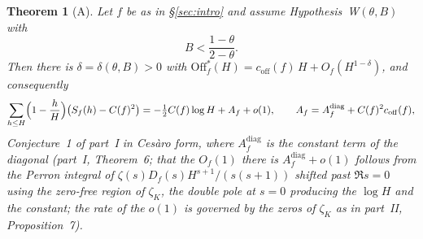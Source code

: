 \documentclass[11pt,a4paper]{article}
\newtheorem{theorem}{Theorem}
\theoremstyle{remark}\newtheorem{remark}[theorem]{Remark}
\newcommand{\Off}{\mathrm{Off}}\newcommand{\e}{\mathrm{e}}
\begin{document}
\begin{theorem}[A]\label{thm:A}
Let $f$ be as in \S\ref{sec:intro} and assume Hypothesis~W$(\theta,B)$ with
\begin{equation}\label{eq:expcond}
B<\frac{1-\theta}{2-\theta} .
\end{equation}
Then there is $\delta=\delta(\theta,B)>0$ with $\Off^\ast_f(H)=c_{\mathrm{off}}(f)\,H+O_f(H^{1-\delta})$, and consequently
\[
\sum_{h\le H}\Bigl(1-\frac hH\Bigr)\bigl(S_f(h)-C(f)^2\bigr)=-\tfrac12C(f)\log H+A_f+o(1),\qquad
A_f=A^{\mathrm{diag}}_f+C(f)^2c_{\mathrm{off}}(f),
\]
Conjecture~1 of part~I in Ces\`aro form, where $A^{\mathrm{diag}}_f$ is the constant term of the diagonal
(part~I, Theorem~6; that the $O_f(1)$ there is $A^{\mathrm{diag}}_f+o(1)$ follows from the Perron integral of
$\zeta(s)D_f(s)H^{s+1}/(s(s+1))$ shifted past $\Re s=0$ using the zero-free region of $\zeta_K$, the double pole at
$s=0$ producing the $\log H$ and the constant; the rate of the $o(1)$ is governed by the zeros of $\zeta_K$ as in
part~II, Proposition~7).
\end{theorem}
\end{document}
